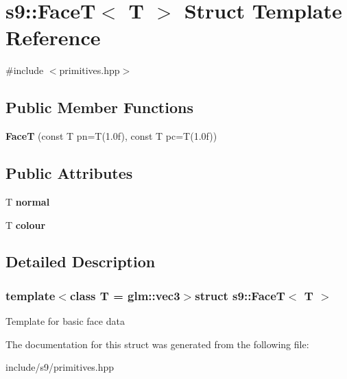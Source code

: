 \hypertarget{structs9_1_1FaceT}{\section{s9\-:\-:Face\-T$<$ T $>$ Struct Template Reference}
\label{structs9_1_1FaceT}
}


{\ttfamily \#include $<$primitives.\-hpp$>$}

\subsection*{Public Member Functions}
\begin{DoxyCompactItemize}
\item 
\hypertarget{structs9_1_1FaceT_aea08fe5c720cb7583848e6b607e08578}{{\bfseries Face\-T} (const T pn=T(1.\-0f), const T pc=\-T(1.\-0f))}\label{structs9_1_1FaceT_aea08fe5c720cb7583848e6b607e08578}

\end{DoxyCompactItemize}
\subsection*{Public Attributes}
\begin{DoxyCompactItemize}
\item 
\hypertarget{structs9_1_1FaceT_a7d09b990558cead182390f8682bccced}{T {\bfseries normal}}\label{structs9_1_1FaceT_a7d09b990558cead182390f8682bccced}

\item 
\hypertarget{structs9_1_1FaceT_aefc4be377e283e8e51400853d5ab193d}{T {\bfseries colour}}\label{structs9_1_1FaceT_aefc4be377e283e8e51400853d5ab193d}

\end{DoxyCompactItemize}


\subsection{Detailed Description}
\subsubsection*{template$<$class T = glm\-::vec3$>$struct s9\-::\-Face\-T$<$ T $>$}

Template for basic face data 

The documentation for this struct was generated from the following file\-:\begin{DoxyCompactItemize}
\item 
include/s9/primitives.\-hpp\end{DoxyCompactItemize}
